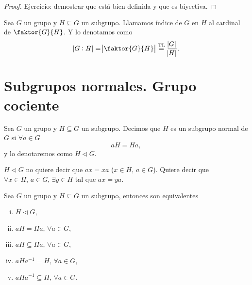 \begin{proof}
    Ejercicio: demostrar que está bien definida y que es biyectiva.
\end{proof}

\begin{defi}
    Sea $G$ un grupo y $H \subseteq G$ un subgrupo. Llamamos índice de $G$ en $H$ al cardinal de $\faktor{G}{H}$.
    Y lo denotamos como
    \[
        \left[G : H \right] = \abs{\faktor{G}{H}} \stackrel{\text{TL}}{=} \frac{\abs{G}}{\abs{H}}.
    \]
\end{defi}

\section{Subgrupos normales. Grupo cociente}

\begin{defi}
    Sea $G$ un grupo y $H \subseteq G$ un subgrupo. Decimos que $H$ es un subgrupo normal de $G$ si
    $\forall a \in G$
    \[
        aH = Ha,
    \]
    y lo denotaremos como $H \triangleleft G$.
\end{defi}

\begin{obs}
    $H \triangleleft G$ no quiere decir que $ax = xa$ ($x \in H, \, a \in G$). Quiere decir que
    $\forall x \in H, \, a \in G, \, \exists y \in H$ tal que $ax = ya$.
\end{obs}

\begin{prop}
    Sea $G$ un grupo y $H \subseteq G$ un subgrupo, entonces son equivalentes
    \begin{enumerate}[(i)]
        \item\label{item:eq_norm_1} $H \triangleleft G$,
        \item\label{item:eq_norm_2} $aH = Ha, \, \forall a \in G$,
        \item\label{item:eq_norm_3} $aH \subseteq Ha, \, \forall a \in G$,
        \item\label{item:eq_norm_4} $aHa^{-1} = H, \, \forall a \in G$,
        \item\label{item:eq_norm_5} $aHa^{-1} \subseteq H, \, \forall a \in G$.
    \end{enumerate}
\end{prop}

